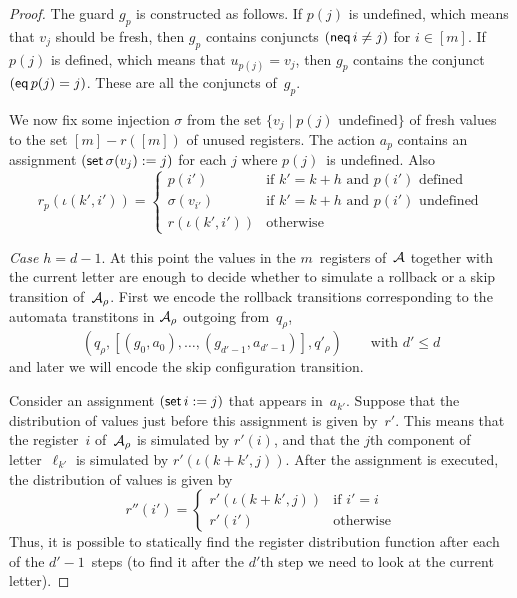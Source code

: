 \documentclass{article} %
\theoremstyle{definition}
\theoremstyle{remark}
\begin{document}
\begin{proof}
The guard $g_p$ is constructed as follows.
If $p(j)$ is undefined, which means that $v_j$ should be fresh, then $g_p$ contains conjuncts $({\sf neq}\,i\ne j)$ for $i\in[m]$.
If $p(j)$ is defined, which means that $u_{p(j)}=v_j$, then $g_p$ contains the conjunct $({\sf eq}\,p(j)=j)$.
These are all the conjuncts of~$g_p$.

We now fix some injection $\sigma$ from the set $\{v_j\mid\text{$p(j)$ undefined}\}$ of fresh values to the set $[m]-r([m])$ of unused registers.
The action $a_p$ contains an assignment $({\sf set}\,\sigma(v_j):=j)$ for each $j$ where $p(j)$~is undefined.
Also
\[ r_p(\iota(k',i')) = \begin{cases}
  p(i')  & \text{if $k'=k+h$ and $p(i')$ defined} \\
  \sigma(v_{i'}) & \text{if $k'=k+h$ and $p(i')$ undefined} \\
  r(\iota(k',i')) &\text{otherwise}
\end{cases}\]


{\it Case $h=d-1$}.
At this point the values in the $m$~registers of~${\cal A}$ together with the current letter are enough to decide whether to simulate a rollback or a skip transition of~${\cal A}_\rho$.
First we encode the rollback transitions corresponding to the automata
transtitons in ${\cal A}_\rho$ outgoing from~$q_\rho$,
\[ (q_\rho, [(g_0,a_0),\ldots,(g_{d'-1},a_{d'-1})], q'_\rho)
  \qquad\text{with $d'\leq d$} \]
and later we will encode the skip configuration transition.

Consider an assignment $({\sf set}\,i:=j)$ that appears in~$a_{k'}$.
Suppose that the distribution of values just before this assignment is given by~$r'$.
This means that the register~$i$ of~${\cal A}_\rho$ is simulated by $r'(i)$, and that the $j$th component of letter~$\ell_{k'}$ is simulated by $r'(\iota(k+k',j))$.
After the assignment is executed, the distribution of values is given by
\[r''(i') = \begin{cases}
  r'(\iota(k+k',j)) & \text{if $i'=i$} \\
  r'(i') & \text{otherwise}
\end{cases}\]
Thus, it is possible to statically find the register distribution function after
each of the $d'-1$~steps (to find it after the $d'$th step we need to
look at the current letter).


\end{proof}
\end{document}
